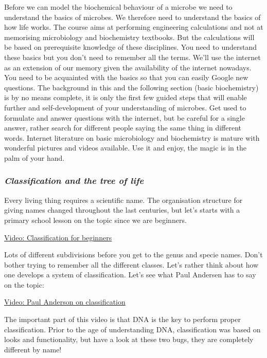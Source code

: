 \documentclass[11pt]{article}
\begin{document}
Before we can model the biochemical behaviour of a microbe we need to
understand the basics of microbes. We therefore need to understand the
basics of how life works. The course aims at performing engineering
calculations and not at memorising microbiology and biochemistry
textbooks. But the calculations will be based on prerequisite knowledge
of these disciplines. You need to understand these basics but you don't
need to remember all the terms. We'll use the internet as an extension
of our memory given the availability of the internet nowadays. You need
to be acquainted with the basics so that you can easily Google new
questions. The background in this and the following section (basic
biochemistry) is by no means complete, it is only the first few guided
steps that will enable further and self-development of your
understanding of microbes. Get used to formulate and answer questions
with the internet, but be careful for a single answer, rather search for
different people saying the same thing in different words. Internet
literature on basic microbiology and biochemistry is mature with
wonderful pictures and videos available. Use it and enjoy, the magic is
in the palm of your hand.

\subsubsection{\texorpdfstring{\emph{Classification and the tree of
life}}{Classification and the tree of life}}\label{classification-and-the-tree-of-life}

Every living thing requires a scientific name. The organisation
structure for giving names changed throughout the last centuries, but
let's starts with a primary school lesson on the topic since we are
beginners.

\href{https://www.youtube.com/watch?v=vqxomJIBGcY}{Video: Classification
for beginners}

Lots of different subdivisions before you get to the genus and specie
names. Don't bother trying to remember all the different classes. Let's
rather think about how one develops a system of classification. Let's
see what Paul Andersen has to say on the topic:

\href{https://www.youtube.com/watch?v=tYL_8gv7RiE}{Video: Paul Anderson
on classification}

The important part of this video is that DNA is the key to perform
proper classification. Prior to the age of understanding DNA,
classification was based on looks and functionality, but have a look at
these two bugs, they are completely different by name!
\end{document}
